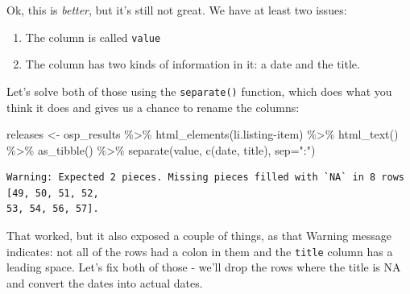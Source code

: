 \documentclass[
  letterpaper,
  DIV=11,
  numbers=noendperiod]{scrreprt}
\newenvironment{Shaded}{\begin{snugshade}}{\end{snugshade}}
\newcommand{\AttributeTok}[1]{\textcolor[rgb]{0.40,0.45,0.13}{#1}}
\newcommand{\FunctionTok}[1]{\textcolor[rgb]{0.28,0.35,0.67}{#1}}
\newcommand{\NormalTok}[1]{\textcolor[rgb]{0.00,0.23,0.31}{#1}}
\newcommand{\OtherTok}[1]{\textcolor[rgb]{0.00,0.23,0.31}{#1}}
\newcommand{\SpecialCharTok}[1]{\textcolor[rgb]{0.37,0.37,0.37}{#1}}
\newcommand{\StringTok}[1]{\textcolor[rgb]{0.13,0.47,0.30}{#1}}
\providecommand{\tightlist}{%
  \setlength{\itemsep}{0pt}\setlength{\parskip}{0pt}}\usepackage{longtable,booktabs,array}
\begin{document}
Ok, this is \emph{better}, but it's still not great. We have at least
two issues:

\begin{enumerate}
\def\labelenumi{\arabic{enumi}.}
\tightlist
\item
  The column is called \texttt{value}
\item
  The column has two kinds of information in it: a date and the title.
\end{enumerate}

Let's solve both of those using the \texttt{separate()} function, which
does what you think it does and gives us a chance to rename the columns:

\begin{Shaded}
\begin{Highlighting}[]
\NormalTok{releases }\OtherTok{\textless{}{-}}\NormalTok{ osp\_results }\SpecialCharTok{\%\textgreater{}\%} \FunctionTok{html\_elements}\NormalTok{(}\StringTok{\textquotesingle{}li.listing{-}item\textquotesingle{}}\NormalTok{) }\SpecialCharTok{\%\textgreater{}\%} \FunctionTok{html\_text}\NormalTok{() }\SpecialCharTok{\%\textgreater{}\%} \FunctionTok{as\_tibble}\NormalTok{() }\SpecialCharTok{\%\textgreater{}\%} \FunctionTok{separate}\NormalTok{(value, }\FunctionTok{c}\NormalTok{(}\StringTok{\textquotesingle{}date\textquotesingle{}}\NormalTok{, }\StringTok{\textquotesingle{}title\textquotesingle{}}\NormalTok{), }\AttributeTok{sep=}\StringTok{":"}\NormalTok{)}
\end{Highlighting}
\end{Shaded}

\begin{verbatim}
Warning: Expected 2 pieces. Missing pieces filled with `NA` in 8 rows [49, 50, 51, 52,
53, 54, 56, 57].
\end{verbatim}

That worked, but it also exposed a couple of things, as that Warning
message indicates: not all of the rows had a colon in them and the
\texttt{title} column has a leading space. Let's fix both of those -
we'll drop the rows where the title is NA and convert the dates into
actual dates.
\end{document}
